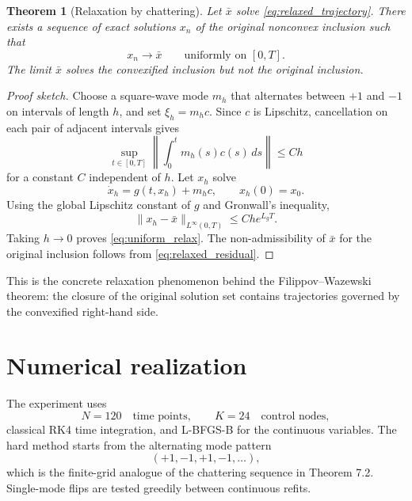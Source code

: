 \documentclass[11pt]{article}
\newtheorem{theorem}[proposition]{Theorem}
\begin{document}
\begin{theorem}[Relaxation by chattering]
Let $\bar x$ solve \eqref{eq:relaxed_trajectory}. There exists a sequence of exact solutions $x_n$ of the original nonconvex inclusion such that
\begin{equation}
    x_n\to\bar x
    \qquad\text{uniformly on }[0,T].
    \label{eq:uniform_relax}
\end{equation}
The limit $\bar x$ solves the convexified inclusion but not the original inclusion.
\end{theorem}

\begin{proof}[Proof sketch]
Choose a square-wave mode $m_h$ that alternates between $+1$ and $-1$ on intervals of length $h$, and set $\xi_h=m_hc$. Since $c$ is Lipschitz, cancellation on each pair of adjacent intervals gives
\begin{equation}
    \sup_{t\in[0,T]}
    \left\lVert\int_0^t m_h(s)c(s)\,ds\right\rVert
    \leq C h
    \label{eq:osc_bound}
\end{equation}
for a constant $C$ independent of $h$. Let $x_h$ solve
\begin{equation}
    \dot x_h=g(t,x_h)+m_hc,
    \qquad x_h(0)=x_0.
\end{equation}
Using the global Lipschitz constant of $g$ and Gronwall's inequality,
\begin{equation}
    \lVert x_h-\bar x\rVert_{L^\infty(0,T)}
    \leq C h e^{L_gT}.
    \label{eq:relax_rate}
\end{equation}
Taking $h\to0$ proves \eqref{eq:uniform_relax}. The non-admissibility of $\bar x$ for the original inclusion follows from \eqref{eq:relaxed_residual}.
\end{proof}

This is the concrete relaxation phenomenon behind the Filippov--Wazewski theorem: the closure of the original solution set contains trajectories governed by the convexified right-hand side.

\section{Numerical realization}

The experiment uses
\begin{equation}
    N=120\quad\text{time points},
    \qquad K=24\quad\text{control nodes},
\end{equation}
classical RK4 time integration, and L-BFGS-B for the continuous variables. The hard method starts from the alternating mode pattern
\begin{equation}
    (+1,-1,+1,-1,\ldots),
\end{equation}
which is the finite-grid analogue of the chattering sequence in Theorem 7.2. Single-mode flips are tested greedily between continuous refits.
\end{document}
